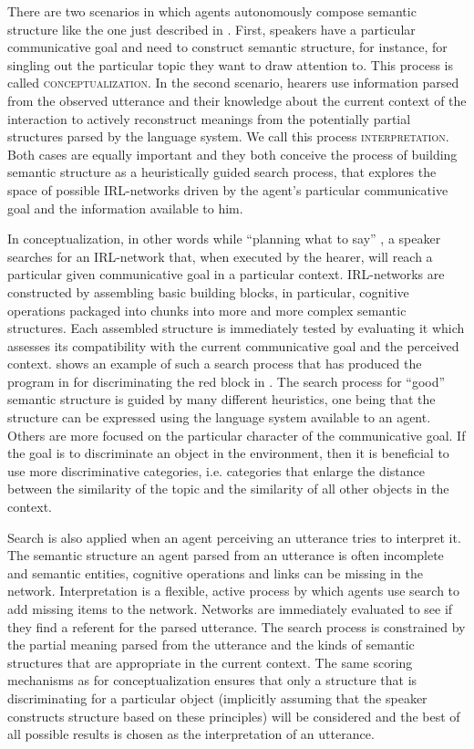 There are two scenarios in which agents autonomously compose semantic
structure like the one just described in . 
First, speakers have a particular communicative goal and need to construct 
semantic structure, for instance, for singling out the particular topic they
want to draw attention to.
This process is called \textsc{conceptualization}. In the second scenario, 
hearers use information parsed from the observed utterance and their 
knowledge about the current context of the interaction to 
actively reconstruct meanings from the potentially partial 
structures parsed by the language system. We call this process 
\textsc{interpretation}. Both cases are equally important and
they both conceive the process of building semantic structure as a heuristically
guided search process, that explores the space of possible IRL-networks 
driven by the agent's particular communicative goal and the information
available to him.

In conceptualization, in other words while ``planning what to say'' 
\citep{steels2005planning}, a speaker searches for an IRL-network 
that, when executed by the hearer, will reach a particular given 
communicative goal in a particular context.  IRL-networks 
are constructed by assembling basic building
blocks, in particular, cognitive operations packaged into chunks
into more and more complex semantic structures. 
Each assembled structure is immediately tested by evaluating it which assesses
its compatibility with the current communicative goal and the perceived context.
 shows an example of such a search process 
that has produced the program in  for discriminating 
the red block in . 
The search process for ``good'' semantic structure is guided by 
many different heuristics, one being that the structure can be expressed using the
language system available to an agent. Others are more focused on the particular
character of the communicative goal. If the goal is to discriminate an object 
in the environment, then it is beneficial to use more discriminative categories, 
i.e. categories that enlarge the distance between the similarity of the topic and 
the similarity of all other objects in the context. 

Search is also applied when an agent perceiving an utterance  tries to 
interpret it. The semantic structure an agent 
parsed from an utterance is often incomplete and
semantic entities, cognitive operations and links can be
missing in the network. Interpretation is a flexible, active process
by which agents use search to add missing items to the network.
Networks are immediately evaluated to see if they find a referent for 
the parsed utterance. The search process is constrained by the partial 
meaning parsed from the utterance and
the kinds of semantic structures that are appropriate in the current context.
The same scoring mechanisms
as for conceptualization ensures that only a structure that is 
discriminating for a particular object (implicitly assuming that the 
speaker constructs structure based on these principles) will be considered 
and the best of all possible results is chosen as the interpretation of an utterance. 

